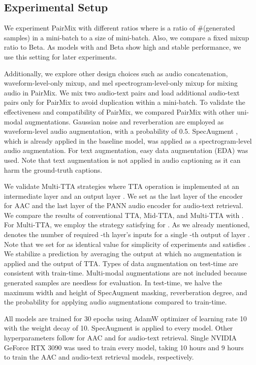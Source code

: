 \documentclass{INTERSPEECH2023}
\begin{document}
\subsection{Experimental Setup}
We experiment PairMix with different ratios  where  is a ratio of \#(generated samples) in a mini-batch to a size of mini-batch. Also, we compare a fixed mixup ratio  to  Beta. As models with  and  Beta show high and stable performance, we use this setting for later experiments. 

Additionally, we explore other design choices such as audio concatenation, waveform-level-only mixup, and mel spectrogram-level-only mixup for mixing audio in PairMix. We mix two audio-text pairs and load additional audio-text pairs only for PairMix to avoid duplication within a mini-batch.
To validate the effectiveness and compatibility of PairMix, we compared PairMix with other uni-modal augmentations. Gaussian noise and reverberation are employed as waveform-level audio augmentation, with a probability of 0.5. SpecAugment \cite{park2019specaugment}, which is already applied in the baseline model, was applied as a spectrogram-level audio augmentation. For text augmentation, easy data augmentation (EDA) \cite{wei2019eda} was used. Note that text augmentation is not applied in audio captioning as it can harm the ground-truth captions. 

We validate Multi-TTA strategies where TTA operation is implemented at an intermediate layer  and an output layer . We set  as the last layer of the encoder for AAC and the last layer of the PANN audio encoder for audio-text retrieval. We compare the results of conventional TTA, Mid-TTA, and Multi-TTA with . For Multi-TTA, we employ the strategy  satisfying  for .
As we already mentioned,  denotes the number of required -th layer's inputs for a single -th output of layer . Note that we set  for  as identical value for simplicity of experiments and  satisfies .
We stabilize a prediction by averaging the output at which no augmentation is applied and the output of TTA. Types of data augmentation on test-time are consistent with train-time. Multi-modal augmentations are not included because generated samples are needless for evaluation. In test-time, we halve the maximum width and height of SpecAugment masking, reverberation degree, and the probability for applying audio augmentations compared to train-time.

All models are trained for 30 epochs using AdamW optimizer of learning rate 10 with the weight decay of 10. SpecAugment is applied to every model. Other hyperparameters follow \cite{mei2021audio} for AAC and \cite{Mei2022-qx} for audio-text retrieval. Single NVIDIA GeForce RTX 3090 was used to train every model, taking 10 hours and 9 hours to train the AAC and audio-text retrieval models, respectively.
\end{document}
